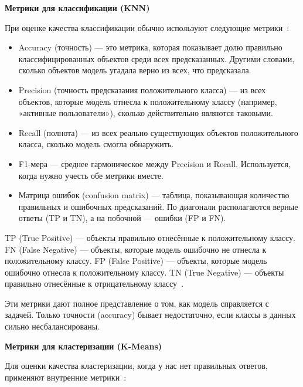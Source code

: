 \documentclass[14pt, a4paper]{extarticle}
\begin{document}
\textbf{Метрики для классификации (KNN)}
\smallskip

При оценке качества классификации обычно используют следующие метрики~\cite{chubukova2024}:

\begin{itemize}
    \item Accuracy (точность) — это метрика, которая показывает долю правильно классифицированных объектов среди всех предсказанных. Другими словами, сколько объектов модель угадала верно из всех, что предсказала.
    
    \item Precision (точность предсказания положительного класса) — из всех объектов, которые модель отнесла к положительному классу (например, «активные пользователи»), сколько действительно являются таковыми.
    
    \item Recall (полнота) — из всех реально существующих объектов положительного класса, сколько модель смогла обнаружить.
    
    \item F1-мера — среднее гармоническое между Precision и Recall. Используется, когда нужно учесть обе метрики вместе.
    
    \item Матрица ошибок (confusion matrix) — таблица, показывающая количество правильных и ошибочных предсказаний. По диагонали располагаются верные ответы (TP и TN), а на побочной — ошибки (FP и FN).
\end{itemize}

TP (True Positive) — объекты правильно отнесённые к положительному классу. FN (False Negative) — объекты, которые модель ошибочно не отнесла к положительному классу. FP (False Positive) — объекты, которые модель ошибочно отнесла к положительному классу. TN (True Negative) — объекты правильно отнесённые к отрицательному классу~\cite{chubukova2024}.

Эти метрики дают полное представление о том, как модель справляется с задачей. Только точности (accuracy) бывает недостаточно, если классы в данных сильно несбалансированы.

\newpage
\textbf{Метрики для кластеризации (K-Means)}
\smallskip

Для оценки качества кластеризации, когда у нас нет правильных ответов, применяют внутренние метрики~\cite{chubukova2024}:
\end{document}
